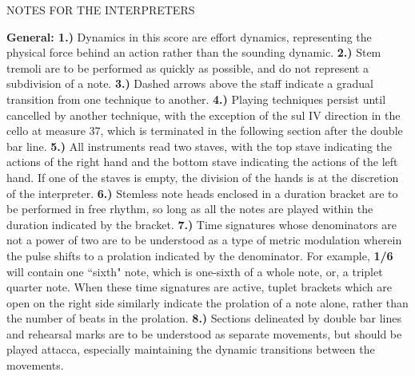 \documentclass[11pt]{article}
\begin{document}
\begingroup
\begin{center}
\huge 
\end{center}
\endgroup

\begingroup
\begin{center}
\huge NOTES FOR THE INTERPRETERS
\end{center}
\endgroup

\begingroup
\begin{center}
\textbf{General: 1.)} Dynamics in this score are effort dynamics, representing the physical force behind an action rather than the sounding dynamic. \textbf{2.)} Stem tremoli are to be performed as quickly as possible, and do not represent a subdivision of a note. \textbf{3.)} Dashed arrows above the staff indicate a gradual transition from one technique to another. \textbf{4.)}  Playing techniques persist until cancelled by another technique, with the exception of the sul IV direction in the cello at measure 37, which is terminated in the following section after the double bar line. \textbf{5.)}  All instruments read two staves, with the top stave indicating the actions of the right hand and the bottom stave indicating the actions of the left hand. If one of the staves is empty, the division of the hands is at the discretion of the interpreter. \textbf{6.)} Stemless note heads enclosed in a duration bracket are to be performed in free rhythm, so long as all the notes are played within the duration indicated by the bracket. \textbf{7.)} Time signatures whose denominators are not a power of two are to be understood as a type of metric modulation wherein the pulse shifts to a prolation indicated by the denominator. For example, \textbf{1/6} will contain one ``sixth" note, which is one-sixth of a whole note, or, a triplet quarter note. When these time signatures are active, tuplet brackets which are open on the right side similarly indicate the prolation of a note alone, rather than the number of beats in the prolation. \textbf{8.)} Sections delineated by double bar lines and rehearsal marks are to be understood as separate movements, but should be played attacca, especially maintaining the dynamic transitions between the movements.\\
\rightskip\leftskip
\end{center}
\endgroup
\end{document}
